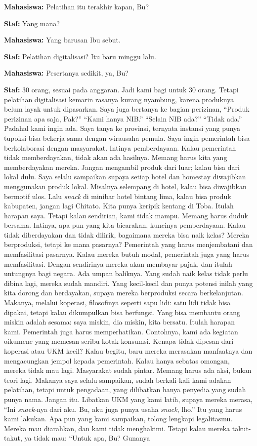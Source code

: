 {\noindent \textbf{Mahasiswa:} Pelatihan itu terakhir kapan, Bu?

\noindent \textbf{Staf:} Yang mana?

\noindent \textbf{Mahasiswa:} Yang barusan Ibu sebut.

\noindent \textbf{Staf:} Pelatihan digitalisasi? Itu baru minggu lalu.

\noindent \textbf{Mahasiswa:} Pesertanya sedikit, ya, Bu?

\noindent \textbf{Staf:} 30 orang, sesuai pada anggaran. Jadi kami bagi untuk 30 orang. Tetapi pelatihan digitalisasi kemarin rasanya kurang nyambung, karena produknya belum layak untuk dipasarkan. Saya juga bertanya ke bagian perizinan, ``Produk perizinan apa saja, Pak?'' ``Kami hanya NIB.'' ``Selain NIB ada?'' ``Tidak ada.'' Padahal kami ingin ada. Saya tanya ke provinsi, ternyata instansi yang punya tupoksi bisa bekerja sama dengan wirausaha pemula. Saya ingin pemerintah bisa berkolaborasi dengan masyarakat. Intinya pemberdayaan. Kalau pemerintah tidak memberdayakan, tidak akan ada hasilnya. Memang harus kita yang memberdayakan mereka. Jangan mengambil produk dari luar; kalau bisa dari lokal dulu. Saya selalu sampaikan supaya setiap hotel dan homestay diwajibkan menggunakan produk lokal. Misalnya selempang di hotel, kalau bisa diwajibkan bermotif ulos. Lalu \textit{snack} di minibar hotel bintang lima, kalau bisa produk kabupaten, jangan lagi Chitato. Kita punya keripik kentang di Toba. Itulah harapan saya. Tetapi kalau sendirian, kami tidak mampu. Memang harus duduk bersama. Intinya, apa pun yang kita bicarakan, kuncinya pemberdayaan. Kalau tidak diberdayakan dan tidak dilirik, bagaimana mereka bisa naik kelas? Mereka berproduksi, tetapi ke mana pasarnya? Pemerintah yang harus menjembatani dan memfasilitasi pasarnya. Kalau mereka butuh modal, pemerintah juga yang harus memfasilitasi. Dengan sendirinya mereka akan membayar pajak, dan itulah untungnya bagi negara. Ada umpan baliknya. Yang sudah naik kelas tidak perlu dibina lagi, mereka sudah mandiri. Yang kecil-kecil dan punya potensi inilah yang kita dorong dan berdayakan, supaya mereka berproduksi secara berkelanjutan. Makanya, melalui koperasi, filosofinya seperti sapu lidi: satu lidi tidak bisa dipakai, tetapi kalau dikumpulkan bisa berfungsi. Yang bisa membantu orang miskin adalah sesama: saya miskin, dia miskin, kita bersatu. Itulah harapan kami. Pemerintah juga harus memperhatikan. Contohnya, kami ada kegiatan oikumene yang memesan seribu kotak konsumsi. Kenapa tidak dipesan dari koperasi atau UKM kecil? Kalau begitu, baru mereka merasakan manfaatnya dan mengacungkan jempol kepada pemerintah. Kalau hanya sebatas omongan, mereka tidak mau lagi. Masyarakat sudah pintar. Memang harus ada aksi, bukan teori lagi. Makanya saya selalu sampaikan, sudah berkali-kali kami adakan pelatihan, tetapi untuk pengadaan, yang dilibatkan hanya penyedia yang sudah punya nama. Jangan itu. Libatkan UKM yang kami latih, supaya mereka merasa, ``Ini \textit{snack}-nya dari aku. Bu, aku juga punya usaha \textit{snack}, lho.'' Itu yang harus kami lakukan. Apa pun yang kami sampaikan, tolong lengkapi legalitasmu. Mereka mau diarahkan, dan kami tidak menghakimi. Tetapi kalau mereka takut-takut, ya tidak mau: ``Untuk apa, Bu? Gunanya }
